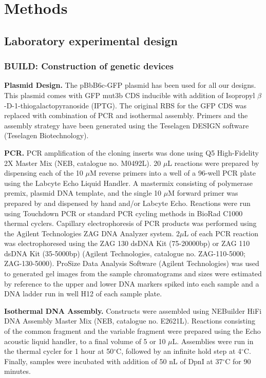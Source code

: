 \section{Methods}

\subsection{Laboratory experimental design}

\subsubsection{BUILD: Construction of genetic devices}

\textbf{Plasmid Design.}
The pBbB6c-GFP plasmid has been used for all our designs.
This plasmid comes with GFP mut3b CDS inducible with addition of Isopropyl $\beta$-D-1-thiogalactopyranoside (IPTG).
The original RBS for the GFP CDS was replaced with combination of PCR and isothermal assembly.
Primers and the assembly strategy have been generated using the Teselagen DESIGN software (Teselagen Biotechnology).

\textbf{PCR.}
PCR amplification of the cloning inserts was done using Q5 High-Fidelity 2X Master Mix (NEB, catalogue no. M0492L).
20 $\mu$L reactions were prepared by dispensing each of the 10 $\mu$M reverse primers into a well of a 96-well PCR plate using the Labcyte Echo Liquid Handler.
A mastermix consisting of polymerase premix, plasmid DNA template, and the single 10 $\mu$M forward primer was prepared by and dispensed by hand and/or Labcyte Echo. Reactions were run using Touchdown PCR or standard PCR cycling methods in BioRad C1000 thermal cyclers.
Capillary electrophoresis of PCR products was performed using the Agilent Technologies ZAG DNA Analyzer system.
2$\mu$L of each PCR reaction was electrophoresed using the ZAG 130 dsDNA Kit (75-20000bp) or ZAG 110 dsDNA Kit (35-5000bp) (Agilent Technologies, catalogue no. ZAG-110-5000; ZAG-130-5000).
ProSize Data Analysis Software (Agilent Technologies) was used to generated gel images from the sample chromatograms and sizes were estimated by reference to the upper and lower DNA markers spiked into each sample and a DNA ladder run in well H12 of each sample plate. 

\textbf{Isothermal DNA Assembly.}
Constructs were assembled using NEBuilder HiFi DNA Assembly Master Mix (NEB, catalogue no. E2621L).
Reactions consisting of the common fragment and the variable fragment were prepared using the Echo acoustic liquid handler, to a final volume of 5 or 10 $\mu$L.
Assemblies were run in the thermal cycler for 1 hour at 50$^{\circ}$C, followed by an infinite hold step at 4$^{\circ}$C.
Finally, samples were incubated with addition of 50 nL of DpnI at 37$^{\circ}$C for 90 minutes.

